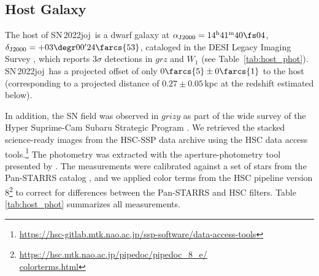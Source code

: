 \documentclass[twocolumn]{aastex631}
\newcommand{\sn}{SN\,2022joj}
\begin{document}
\begin{CJK*}{UTF8}{gbsn}
\subsection{Host Galaxy}\label{sec:host}
The host of \sn\ is a dwarf galaxy at $\alpha_\mathrm{J2000}=14^\mathrm{h}41^\mathrm{m}40\fs04$, $\delta_\mathrm{J2000}=+03\degr00'24\farcs{53}$, cataloged in the DESI Legacy Imaging Survey \citep[LS;][]{Dey_LS_2019}, which reports 3$\sigma$ detections in $grz$ and $W_1$ (see Table~\ref{tab:host_phot}). \sn\ has a projected offset of only $0\farcs{5}\pm0\farcs{1}$ to the host (corresponding to a projected distance of $0.27\pm0.05$\,kpc at the redshift estimated below). 

In addition, the SN field was observed in $grizy$ as part of the wide survey of the Hyper Suprime-Cam Subaru Strategic Program \citep[HSC-SSP;][]{Aihara2018a}. We retrieved the stacked science-ready images from the HSC-SSP data archive using the HSC data access tools.\footnote{\href{https://hsc-gitlab.mtk.nao.ac.jp/ssp-software/data-access-tools}{https://hsc-gitlab.mtk.nao.ac.jp/ssp-software/data-access-tools}} The photometry was extracted with the aperture-photometry tool presented by \citet{Schulze2018a}. The measurements were calibrated against a set of stars from the Pan-STARRS catalog \citep{PS1_2016}, and we applied color terms from the HSC pipeline version 8\footnote{\href{https://hsc.mtk.nao.ac.jp/pipedoc/pipedoc_8_e/colorterms.html}{https://hsc.mtk.nao.ac.jp/pipedoc/pipedoc\_8\_e/\\colorterms.html}} to correct for differences between the Pan-STARRS and HSC filters. Table \ref{tab:host_phot} summarizes all measurements.


\end{CJK*}
\end{document}
